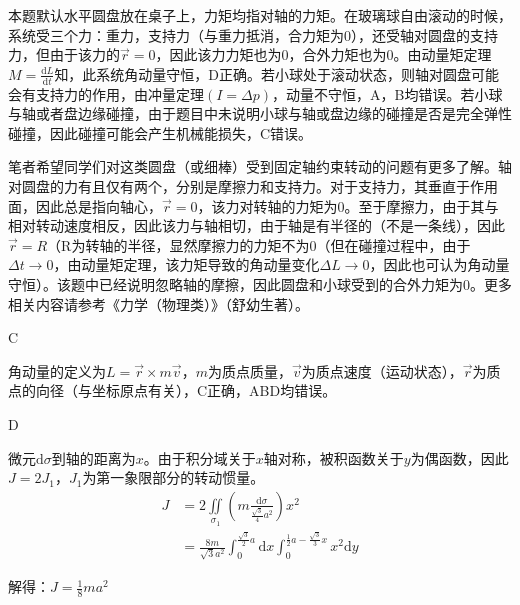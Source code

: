 \documentclass[b5paper,opensource,sourcefont,parskip]{qyxf-book}
\newcommand{\di}[1]{\mathrm{d}#1}
\newcommand{\dy}[2]{\frac{\di{#1}}{\di{#2}}}
\newcommand{\zbj}[4]
{
	\draw (0,0) node[below left] {$ O $};
	\draw [->] (#1,0) -- (#2,0) node[right] {$ x $};
	\draw [->] (0,#3) -- (0,#4) node[right] {$ y $};
}
\begin{document}
本题默认水平圆盘放在桌子上，力矩均指对轴的力矩。在玻璃球自由滚动的时候，系统受三个力：重力，支持力（与重力抵消，合力矩为0），还受轴对圆盘的支持力，但由于该力的$ \vec{r}=0 $，因此该力力矩也为0，合外力矩也为0。由动量矩定理$ M=\dy{L}{t} $知，此系统角动量守恒，D正确。若小球处于滚动状态，则轴对圆盘可能会有支持力的作用，由冲量定理$ (I=\Delta p) $，动量不守恒，A，B均错误。若小球与轴或者盘边缘碰撞，由于题目中未说明小球与轴或盘边缘的碰撞是否是完全弹性碰撞，因此碰撞可能会产生机械能损失，C错误。\\
\begin{note}
笔者希望同学们对这类圆盘（或细棒）受到固定轴约束转动的问题有更多了解。轴对圆盘的力有且仅有两个，分别是摩擦力和支持力。对于支持力，其垂直于作用面，因此总是指向轴心，$ \vec{r}=0 $，该力对转轴的力矩为0。至于摩擦力，由于其与相对转动速度相反，因此该力与轴相切，由于轴是有半径的（不是一条线），因此$ \vec{r}=R $（R为转轴的半径，显然摩擦力的力矩不为0（但在碰撞过程中，由于$ \Delta t\to 0 $，由动量矩定理，该力矩导致的角动量变化$ \Delta L\to 0 $，因此也可认为角动量守恒）。该题中已经说明忽略轴的摩擦，因此圆盘和小球受到的合外力矩为0。更多相关内容请参考《力学（物理类）》（舒幼生著）。
\end{note}
			
C
			
角动量的定义为$ L=\vec{r}\times m\vec{v} $，$ m $为质点质量，$ \vec{v} $为质点速度（运动状态），$ \vec{r} $为质点的向径（与坐标原点有关），C正确，ABD均错误。
			
D
		
\par
微元$ \di{\sigma} $到轴的距离为$ x $。由于积分域关于$ x $轴对称，被积函数关于$ y $为偶函数，因此$ J=2J_1 $，$ J_1 $为第一象限部分的转动惯量。
\begin{align*}
J&=2\iint\limits_{\sigma_1}\left(m\frac{\di{\sigma}}{\frac{\sqrt{3}}{4}a^2}\right)x^2\\
&=\frac{8m}{\sqrt{3}a^2}\int_0^{\frac{\sqrt{3}}{2}a}\di{x}\int_0^{\frac{1}{2}a-\frac{\sqrt{3}}{3}x}x^2\di{y}
\end{align*}\par
解得：$ J=\frac{1}{8}ma^2 $
\end{document}
